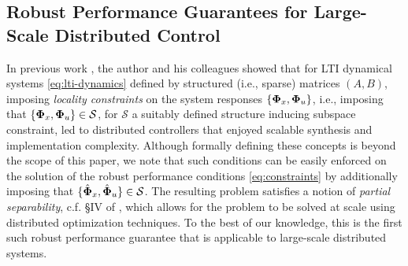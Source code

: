 
\subsection{Robust Performance Guarantees for Large-Scale Distributed Control}
\label{sec:extensions}
In previous work \cite{wang2014localized,wang2016localized,wang2018separable}, the author and his colleagues showed that for LTI dynamical systems \eqref{eq:lti-dynamics} defined by structured (i.e., sparse) matrices $(A,B)$, imposing \emph{locality constraints} on the system responses $\{\boldsymbol{\Phi}_x,\boldsymbol{\Phi}_u\}$, i.e., imposing that $\{\boldsymbol{\Phi}_x,\boldsymbol{\Phi}_u\} \in \mathcal{S}$, for $\mathcal{S}$ a suitably defined structure inducing subspace constraint, led to distributed controllers that enjoyed scalable synthesis and implementation complexity.  Although formally defining these concepts is beyond the scope of this paper, we note that such conditions can be easily enforced on the solution of the robust performance conditions \eqref{eq:constraints} by additionally imposing that $\{\hat{\boldsymbol{\Phi}}_x,\hat{\boldsymbol{\Phi}}_u\}\in\mathcal{S}$.   The resulting problem satisfies a notion of \emph{partial separability}, c.f. \S IV of \cite{wang2018separable}, which allows for the problem to be solved at scale using distributed optimization techniques.  To the best of our knowledge, this is the first such robust performance guarantee that is applicable to large-scale distributed systems.


